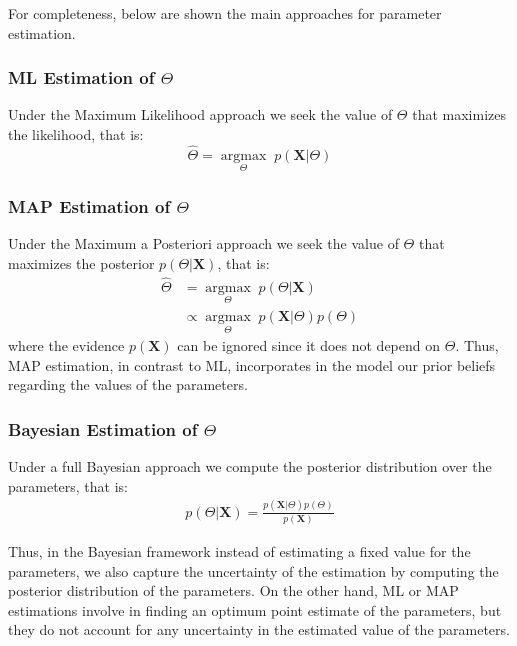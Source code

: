 For completeness, below are shown the main approaches for parameter estimation.
\subsubsection*{ML Estimation of $\Theta$}
Under the Maximum Likelihood approach we seek the value of $\Theta$ that maximizes the likelihood, that is:
\begin{equation} \label{MLE-f-bayes}
	\hat{\Theta} =  \underset{\Theta}{\operatorname{argmax}} \; p(\mathbf{X}|\Theta)
\end{equation}
\subsubsection*{MAP Estimation of $\Theta$}
Under the Maximum a Posteriori approach we seek the value of $\Theta$ that maximizes the posterior $p(\Theta | \mathbf{X})$, that is:
\begin{equation} \label{MAP-f-bayes}
  \begin{aligned}
	\hat{\Theta} & =  \underset{\Theta}{\operatorname{argmax}} \; p(\Theta | \mathbf{X}) \\
	& \propto \underset{\Theta}{\operatorname{argmax}} \; p(\mathbf{X}|\Theta) p(\Theta)
  \end{aligned}
\end{equation}
where the evidence $p(\mathbf{X})$ can be ignored since it does not depend on $\Theta$. Thus, MAP estimation, in contrast to ML, incorporates in the model our prior beliefs regarding the values of the parameters.
\subsubsection*{Bayesian Estimation of $\Theta$}
Under a full Bayesian approach we compute the posterior distribution over the parameters, that is:
\begin{equation} \label{posterior-f-bayes}
  \begin{aligned}
	p(\Theta | \mathbf{X}) = \frac{p(\mathbf{X}|\Theta) p(\Theta)}{p(\mathbf{X})} 
  \end{aligned}
\end{equation}

Thus, in the Bayesian framework instead of estimating a fixed value for the parameters, we also capture the uncertainty of the estimation by computing the posterior distribution of the parameters. On the other hand, ML or MAP estimations involve in finding an optimum point estimate of the parameters, but they do not account for any uncertainty in the estimated value of the parameters. 

